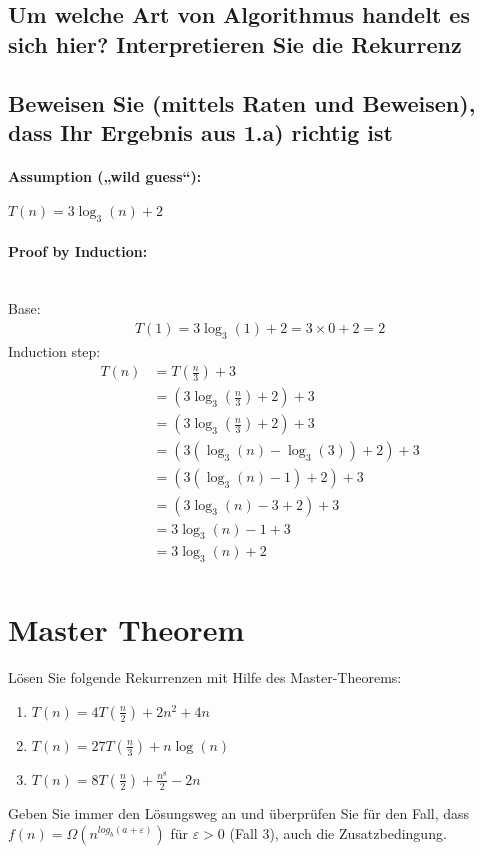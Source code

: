 \documentclass[12pt,letterpaper]{article}
\begin{document}
\subsection{Um welche Art von Algorithmus handelt es sich hier? Interpretieren Sie die Rekurrenz}

\subsection{Beweisen Sie (mittels Raten und Beweisen), dass Ihr Ergebnis aus 1.a) richtig ist}
\paragraph{Assumption („wild guess“):}
$T(n) = 3 \log_3(n) + 2$
\paragraph{Proof by Induction:}\mbox{}\\
Base:
\begin{align*}
    T(1) = 3\log_3(1) + 2 = 3 \times 0 + 2 = 2
\end{align*}
Induction step:
\begin{align*}
    T(n) & = T(\frac{n}{3}) + 3                   \\
         & = (3 \log_3(\frac{n}{3}) + 2) + 3      \\
         & = (3 \log_3(\frac{n}{3}) + 2) + 3      \\
         & = (3 (\log_3(n) - \log_3(3))  + 2) + 3 \\
         & = (3 (\log_3(n) - 1)  + 2) + 3         \\
         & = (3\log_3(n) - 3  + 2) + 3            \\
         & = 3\log_3(n) - 1 + 3                   \\
         & = 3\log_3(n) + 2                       \\
\end{align*}

\pagebreak
\section{Master Theorem}
Lösen Sie folgende Rekurrenzen mit Hilfe des Master-Theorems:
\begin{enumerate}[label=(\alph*)]
    \item $T(n) = 4 T(\frac{n}{2}) + 2n^2 + 4n$
    \item $T(n) = 27 T(\frac{n}{3}) + n \log(n)$
    \item $T(n) = 8 T(\frac{n}{2}) + \frac{n^8}{2} - 2n$
\end{enumerate}
Geben Sie immer den Lösungsweg an und überprüfen Sie für den Fall, dass
$f(n) = \Omega(n^{log_b(a + \varepsilon)})$ für $\varepsilon > 0$ (Fall 3), auch die Zusatzbedingung.
\end{document}

